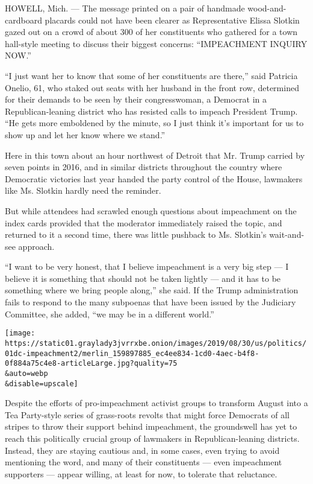 HOWELL, Mich. --- The message printed on a pair of handmade
wood-and-cardboard placards could not have been clearer as
Representative Elissa Slotkin gazed out on a crowd of about 300 of her
constituents who gathered for a town hall-style meeting to discuss their
biggest concerns: ``IMPEACHMENT INQUIRY NOW.''

``I just want her to know that some of her constituents are there,''
said Patricia Onelio, 61, who staked out seats with her husband in the
front row, determined for their demands to be seen by their
congresswoman, a Democrat in a Republican-leaning district who has
resisted calls to impeach President Trump. ``He gets more emboldened by
the minute, so I just think it's important for us to show up and let her
know where we stand.''

Here in this town about an hour northwest of Detroit that Mr. Trump
carried by seven points in 2016, and in similar districts throughout the
country where Democratic victories last year handed the party control of
the House, lawmakers like Ms. Slotkin hardly need the reminder.

But while attendees had scrawled enough questions about impeachment on
the index cards provided that the moderator immediately raised the
topic, and returned to it a second time, there was little pushback to
Ms. Slotkin's wait-and-see approach.

``I want to be very honest, that I believe impeachment is a very big
step --- I believe it is something that should not be taken lightly ---
and it has to be something where we bring people along,'' she said. If
the Trump administration fails to respond to the many subpoenas that
have been issued by the Judiciary Committee, she added, ``we may be in a
different world.''

\texttt{[image: https://static01.graylady3jvrrxbe.onion/images/2019/08/30/us/politics/01dc-impeachment2/merlin\_159897885\_ec4ee834-1cd0-4aec-b4f8-0f884a75c4e8-articleLarge.jpg?quality=75\\\&auto=webp\\\&disable=upscale]}

Despite the efforts of pro-impeachment activist groups to transform
August into a Tea Party-style series of grass-roots revolts that might
force Democrats of all stripes to throw their support behind
impeachment, the groundswell has yet to reach this politically crucial
group of lawmakers in Republican-leaning districts. Instead, they are
staying cautious and, in some cases, even trying to avoid mentioning the
word, and many of their constituents --- even impeachment supporters ---
appear willing, at least for now, to tolerate that reluctance.

